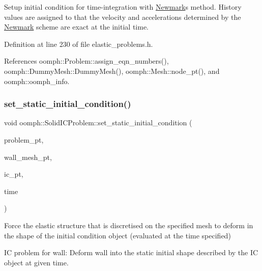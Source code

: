 Setup initial condition for time-\/integration with \hyperlink{classoomph_1_1Newmark}{Newmark}\textquotesingle{}s method. History values are assigned to that the velocity and accelerations determined by the \hyperlink{classoomph_1_1Newmark}{Newmark} scheme are exact at the initial time. 



Definition at line 230 of file elastic\+\_\+problems.\+h.



References oomph\+::\+Problem\+::assign\+\_\+eqn\+\_\+numbers(), oomph\+::\+Dummy\+Mesh\+::\+Dummy\+Mesh(), oomph\+::\+Mesh\+::node\+\_\+pt(), and oomph\+::oomph\+\_\+info.

\mbox{\label{classoomph_1_1SolidICProblem_a60e1dccbc8627a07bfcb38a55b0669ca}} 
\subsubsection{\texorpdfstring{set\+\_\+static\+\_\+initial\+\_\+condition()}{set\_static\_initial\_condition()}\hspace{0.1cm}{\footnotesize\ttfamily [1/2]}}
{\footnotesize\ttfamily void oomph\+::\+Solid\+I\+C\+Problem\+::set\+\_\+static\+\_\+initial\+\_\+condition (\begin{DoxyParamCaption}\item[{\hyperlink{classoomph_1_1Problem}{Problem} $\ast$}]{problem\+\_\+pt,  }\item[{\hyperlink{classoomph_1_1Mesh}{Mesh} $\ast$}]{wall\+\_\+mesh\+\_\+pt,  }\item[{\hyperlink{classoomph_1_1SolidInitialCondition}{Solid\+Initial\+Condition} $\ast$}]{ic\+\_\+pt,  }\item[{const double \&}]{time }\end{DoxyParamCaption})}



Force the elastic structure that is discretised on the specified mesh to deform in the shape of the initial condition object (evaluated at the time specified) 

IC problem for wall\+: Deform wall into the static initial shape described by the IC object at given time. 

